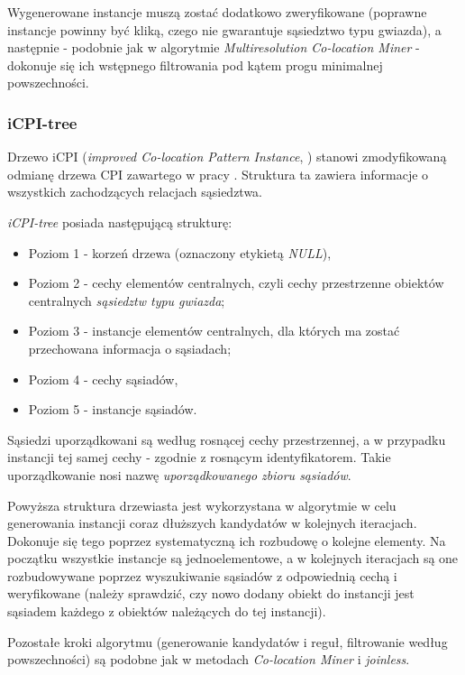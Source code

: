 \documentclass[12pt]{article}
\begin{document}
Wygenerowane instancje muszą zostać dodatkowo zweryfikowane (poprawne instancje powinny być kliką, czego nie gwarantuje sąsiedztwo typu gwiazda), a następnie - podobnie jak w algorytmie \textit{Multiresolution Co-location Miner} - dokonuje się ich wstępnego filtrowania pod kątem progu minimalnej powszechności.

\subsubsection{iCPI-tree}

Drzewo iCPI (\textit{improved Co-location Pattern Instance}, \cite{icpi}) stanowi zmodyfikowaną odmianę drzewa CPI zawartego w pracy \cite{cpi}. Struktura ta zawiera informacje o wszystkich zachodzących relacjach sąsiedztwa. 

\textit{iCPI-tree} posiada następującą strukturę:

\begin{itemize}
\item Poziom 1 - korzeń drzewa (oznaczony etykietą \textit{NULL}),
\item Poziom 2 - cechy elementów centralnych, czyli cechy przestrzenne obiektów centralnych \textit{sąsiedztw typu gwiazda};
\item Poziom 3 - instancje elementów centralnych, dla których ma zostać przechowana informacja o sąsiadach;
\item Poziom 4 - cechy sąsiadów,
\item Poziom 5 - instancje sąsiadów.
\end{itemize}

Sąsiedzi uporządkowani są według rosnącej cechy przestrzennej, a w przypadku instancji tej samej cechy - zgodnie z rosnącym identyfikatorem. Takie uporządkowanie nosi nazwę \textit{uporządkowanego zbioru sąsiadów}.

Powyższa struktura drzewiasta jest wykorzystana w algorytmie w celu generowania instancji coraz dłuższych kandydatów w kolejnych iteracjach. Dokonuje się tego poprzez systematyczną ich rozbudowę o kolejne elementy. Na początku wszystkie instancje są jednoelementowe, a w kolejnych iteracjach są one rozbudowywane poprzez wyszukiwanie sąsiadów z odpowiednią cechą i weryfikowane (należy sprawdzić, czy nowo dodany obiekt do instancji jest sąsiadem każdego z obiektów należących do tej instancji). 

Pozostałe kroki algorytmu (generowanie kandydatów i reguł, filtrowanie według powszechności) są podobne jak w metodach \textit{Co-location Miner} i \textit{joinless}.
\end{document}
